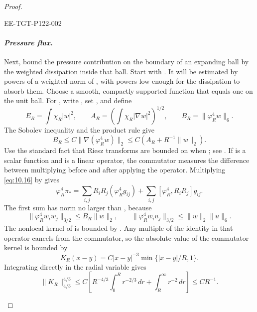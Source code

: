 \begin{proof}
\begin{EESegment}{EE-TGT-P122-002}
\paragraph{\normalfont\itshape Pressure flux.}
Next, bound the pressure contribution on the boundary of an expanding ball by the weighted
dissipation inside that ball. Start with
. It will be estimated by powers of a
weighted  norm of , with powers low
enough for the dissipation to absorb them. Choose a smooth, compactly supported function
 that equals one on the unit ball. For
, write
, set
, and define
\[
  E_R=\int\chi_R|w|^2,\qquad
  A_R=\left(\int\chi_R|\nabla w|^2\right)^{1/2},\qquad
  B_R=\|\varphi_R^4w\|_6.
\]
The Sobolev inequality and the product rule give
\begin{equation}
  B_R\leq C\|\nabla(\varphi_R^4w)\|_2
  \leq C(A_R+R^{-1}\|w\|_2).
\tag{10.17}\label{eq:10.17}
\end{equation}
Use the standard fact that Riesz transforms are bounded on 
when ; see \cite{ref-20}. If
 is a scalar function and  is a
linear operator, the commutator
 measures the
difference between multiplying before and after applying the operator. Multiplying
\eqref{eq:10.16} by  gives
\begin{equation}
  \varphi_R^4\pi_*
  =\sum_{i,j}R_iR_j(\varphi_R^4g_{ij})
   +\sum_{i,j}[\varphi_R^4,R_iR_j]g_{ij}.
\tag{10.18}\label{eq:10.18}
\end{equation}
The first sum has  norm no larger than
, because
\[
  \|\varphi_R^4w_iw_j\|_{3/2}\leq B_R\|w\|_2,\qquad
  \|\varphi_R^4w_iu_j\|_{3/2}\leq\|w\|_2\|u\|_6.
\]
The nonlocal kernel of  is bounded by
. Any multiple of the identity in that operator
cancels from the commutator, so the absolute value of the commutator kernel is bounded by
\[
  K_R(x-y)=C|x-y|^{-3}\min\{|x-y|/R,1\}.
\]
Integrating directly in the radial variable gives
\[
  \|K_R\|_{4/3}^{4/3}
  \leq C\left[
    R^{-4/3}\int_0^R r^{-2/3}\,dr+\int_R^\infty r^{-2}\,dr
  \right]
  \leq CR^{-1}.
\]
\end{EESegment}


\end{proof}
